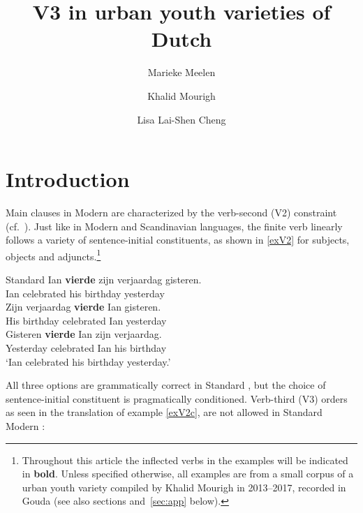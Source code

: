 \documentclass[output=paper]{langsci/langscibook}
\title{V3 in urban youth varieties of Dutch}
\author{Marieke Meelen\affiliation{University of Cambridge}\and
    Khalid Mourigh\affiliation{Leiden University}\and
    Lisa Lai-Shen Cheng \affiliation{Leiden University}}
\begin{document}
\glsresetall

\section{Introduction}
\label{sec:intro}


\noindent Main clauses in Modern  are characterized by the verb-second
(V2) constraint (cf.\ \citealt{Zwart:1997}). Just like in Modern  and
Scandinavian languages, the finite verb linearly follows a variety of
sentence-initial constituents, as shown in \eqref{exV2} for subjects,
objects and adjuncts.\footnote{Throughout this article the inflected verbs in
    the examples will be indicated in \textbf{bold}. Unless specified
    otherwise, all examples are from a small corpus of a  urban youth
    variety compiled by Khalid Mourigh in 2013--2017, recorded in Gouda (see
also sections  and~\ref{sec:app} below).}

\ea\label{exV2} Standard 
    \ea
    \gll Ian \textbf{vierde} zijn verjaardag gisteren.\\
    Ian celebrated his birthday yesterday\\
    \ex
    \gll Zijn verjaardag \textbf{vierde} Ian gisteren.\\
    His birthday celebrated Ian yesterday\\
    \ex
    \gll\label{exV2c}Gisteren \textbf{vierde} Ian zijn verjaardag.\\
    Yesterday celebrated Ian his birthday\\
    \trans \enquote*{Ian celebrated his birthday yesterday.}
    \z
\z

\noindent All three options are grammatically correct in Standard , but
the choice of sentence-initial constituent is pragmatically conditioned.
Verb-third (V3) orders as seen in the  translation of example
\eqref{exV2c}, are not allowed in Standard Modern :
\end{document}
